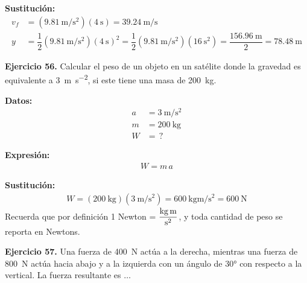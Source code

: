 \documentclass[14pt]{extarticle}
\begin{document}
\vspace*{0.3cm}
\textbf{Sustitución:}
\begin{align*}
v_{f} &= \left( \SI[per-mode=fraction]{9.81}{\meter\per\square\second} \right) (\SI{4}{\second}) = \SI[per-mode=fraction]{39.24}{\meter\per\second} \\[0.5em]
y &= \dfrac{1}{2} \left( \SI[per-mode=fraction]{9.81}{\meter\per\square\second} \right)(\SI{4}{\second})^{2} = \dfrac{1}{2} \left( \SI[per-mode=fraction]{9.81}{\meter\per\square\second} \right)(\SI{16}{\square\second}) = \dfrac{\SI{156.96}{\meter}}{2} = \SI{78.48}{\meter}
\end{align*}

\vspace*{0.3cm}
\textbf{Ejercicio 56. } Calcular el peso de un objeto en un satélite donde la gravedad es equivalente a \SI{3}{\meter\per\square\second}, si este tiene una masa de \SI{200}{\kilo\gram}.

\vspace*{0.3cm}
\begin{minipage}[t]{0.4\linewidth}
\textbf{Datos:}
\begin{align*}
a &= \SI{3}{\meter\per\square\second} \\
m &= \SI{200}{\kilo\gram} \\
W &= \, ?
\end{align*}
\end{minipage}
\begin{minipage}[t]{0.4\linewidth}
\textbf{Expresión:}
\begin{align*}
W = m \, a
\end{align*}
\end{minipage}

\vspace*{0.3cm}
\textbf{Sustitución:}
\begin{align*}
W = \left( \SI{200}{\kilo\gram} \right) \left( \SI[per-mode=fraction]{3}{\meter\per\square\second} \right) = \SI[per-mode=fraction]{600}{\kilo\gram\meter\per\square\second} = \SI{600}{\newton}
\end{align*}
Recuerda que por definición 1 Newton = $\displaystyle \unit[per-mode=fraction]{\kilo\gram\meter\per\square\second}$, y toda cantidad de peso se reporta en Newtons.

\vspace*{0.3cm}
\textbf{Ejercicio 57. } Una fuerza de \SI{400}{\newton} actúa a la derecha, mientras una fuerza de \SI{800}{\newton} actúa hacia abajo y a la izquierda con un ángulo de \ang{30} con respecto a la vertical. La fuerza resultante es $\ldots$
\end{document}

